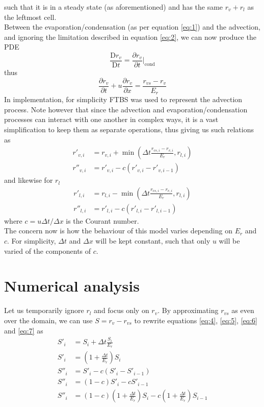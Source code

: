 \documentclass[11pt]{article}
\begin{document}
such that it is in a steady state (as aforementioned) and has the same $r_v+r_l$ as the leftmost cell. \\
Between the evaporation/condensation (as per equation \ref{eq:1}) and the advection, and ignoring the limitation described in equation \ref{eq:2}, we can now produce the PDE
\[
\frac{\text{D} r_v}{\text{D} t}=\frac{\partial r_v}{\partial t}|_{\text{cond}}
\]
thus
\begin{equation} \label{eq:3}
\frac{\partial r_v}{\partial t}+u\frac{\partial r_v}{\partial x}=\frac{r_{vs} - r_v}{E_r}
\end{equation}
In implementation, for simplicity FTBS was used to represent the advection process. Note however that since the advection and evaporation/condensation processes can interact with one another in complex ways, it is a vast simplification to keep them as separate operations, thus giving us such relations as
\begin{align} \label{eq:4}
r'_{v,i} &= r_{v,i} + \min\left(\Delta t\frac{r_{vs,i} - r_{v,i}}{E_r},r_{l,i}\right) \\ \label{eq:5}
r''_{v,i} &= r'_{v,i} - c\left(r'_{v,i} - r'_{v,i-1}\right)
\end{align}
and likewise for $r_l$
\begin{align} \label{eq:6}
r'_{l,i} &= r_{l,i} - \min\left(\Delta t\frac{r_{vs,i} - r_{v,i}}{E_r},r_{l,i}\right) \\ \label{eq:7}
r''_{l,i} &= r'_{l,i} - c\left(r'_{l,i} - r'_{l,i-1}\right)
\end{align}
where $c=u \Delta t/\Delta x$ is the Courant number. \\
The concern now is how the behaviour of this model varies depending on $E_r$ and $c$. For simplicity, $\Delta t$ and $\Delta x$ will be kept constant, such that only $u$ will be varied of the components of $c$.

\section{Numerical analysis}
Let us temporarily ignore $r_l$ and focus only on $r_v$. By approximating $r_{vs}$ as even over the domain, we can use $S=r_v-r_{vs}$ to rewrite equations \ref{eq:4}, \ref{eq:5}, \ref{eq:6} and \ref{eq:7} as
\begin{align}
S'_i &= S_i + \Delta t\frac{S_i}{E_r}		\nonumber \\
S'_i &= \left(1+\frac{\Delta t}{E_r}\right)S_i	\nonumber \\
S''_i &= S'_i - c\left(S'_i - S'_{i-1}\right)		\nonumber \\
S''_i &= \left(1-c\right)S'_i - cS'_{i-1}		\nonumber \\
S''_i &= \left(1-c\right)\left(1+\frac{\Delta t}{E_r}\right)S_i - c\left(1+\frac{\Delta t}{E_r}\right)S_{i-1}	\label{eq:9}
\end{align}
\end{document}
